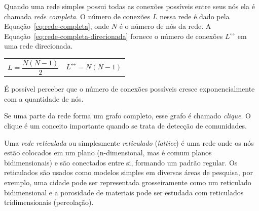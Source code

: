 \documentclass[12pt,a4paper]{article}
\theoremstyle{hypo}
\newcommand{\linkboth}[1]{#1^\leftrightarrow} %
\begin{document}
Quando uma rede simples possui todas as conexões possíveis entre seus nós ela é chamada \textit{rede completa}. O número de conexões $L$ nessa rede é dado pela Equação~\ref{eq:rede-completa}, onde $N$ é o número de nós da rede. A Equação~\ref{eq:rede-completa-direcionada} fornece o número de conexões $\linkboth{L}$ em uma rede direcionada.

\noindent
\begin{tabularx}{\linewidth}{@{}XX@{}}
    \begin{equation} \label{eq:rede-completa}
    L = \frac{N(N - 1)}{2}
    \end{equation} &
    \begin{equation} \label{eq:rede-completa-direcionada}
    \linkboth{L} = N(N - 1)
    \end{equation}
\end{tabularx}

É possível perceber que o número de conexões possíveis cresce exponencialmente com a quantidade de nós.

Se uma parte da rede forma um grafo completo, esse grafo é chamado \textit{clique}. O clique é um conceito importante quando se trata de detecção de comunidades.

Uma \textit{rede reticulada} ou simplesmente \textit{reticulado} (\textit{lattice}) é uma rede onde os nós estão colocados em um plano (n-dimensional, mas é comum planos bidimensionais) e são conectados entre si, formando um padrão regular. Os reticulados são usados como modelos simples em diversas áreas de pesquisa, por exemplo, uma cidade pode ser representada grosseiramente como um reticulado bidimensional e a porosidade de materiais pode ser estudada com reticulados tridimensionais (percolação).
\end{document}
